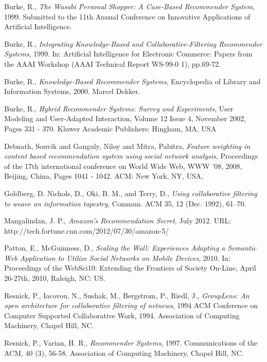\begin{thebibliography}{9}

     Burke, R., \emph{The Wasabi Personal Shopper: A Case-Based Recommender System}, 1999. Submitted to the 11th Annual Conference on Innovative Applications of Artificial Intelligence.

     Burke, R., \emph{Integrating Knowledge-Based and Collaborative-Filtering Recommender Systems}, 1999. In: Artificial Intelligence for Electronic Commerce: Papers from the AAAI Workshop (AAAI Technical Report WS-99-0 1), pp.69-72.

     Burke, R., \emph{Knowledge-Based Recommender Systems}, Encyclopedia of Library and Information Systems, 2000. Marcel Dekker.

     Burke, R., \emph{Hybrid Recommender Systems: Survey and Experiments}, User Modeling and User-Adapted Interaction, Volume 12 Issue 4, November 2002, Pages 331 - 370. Kluwer Academic Publishers: Hingham, MA, USA

     Debnath, Souvik and Ganguly, Niloy and Mitra, Pabitra, \emph{
        Feature weighting in content based recommendation system using social network analysis}, Proceedings of the 17th international conference on World Wide Web, WWW '08, 2008, Beijing, China, Pages 1041 - 1042. ACM: New York, NY, USA,

     Goldberg, D. Nichols, D., Oki, B. M., and Terry, D., \emph{Using collaborative filtering to weave an information tapestry}, Commun. ACM 35, 12 (Dec. 1992), 61--70.

     Mangalindan, J. P., \emph{Amazon's Recommendation Secret}, July 2012. URL: http://tech.fortune.cnn.com/2012/07/30/amazon-5/

     Patton, E., McGuinness, D., \emph{Scaling the Wall: Experiences Adapting a Semantic Web Application to Utilize Social Networks on Mobile Devices}, 2010. In: Proceedings of the WebSci10: Extending the Frontiers of Society On-Line, April 26-27th, 2010, Raleigh, NC: US.

     Resnick, P., Iacovou, N., Sushak, M., Bergstrom, P., Riedl, J., \emph{GroupLens: An open architecture for collaborative filtering of netnews}, 1994 ACM Conference on Computer Supported Collaborative Work, 1994. Association of Computing Machinery, Chapel Hill, NC.

     Resnick, P., Varian, H. R., \emph{Recommender Systems}, 1997. Communications of the ACM, 40 (3), 56-58. Association of Computing Machinery, Chapel Hill, NC.


\end{thebibliography}
